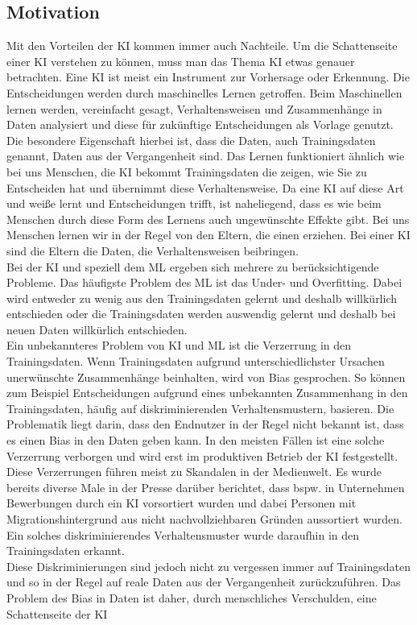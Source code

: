 \begin{onehalfspace}
        \newpage
        \section{Motivation}
        \label{subsec:motivation}
            Mit den Vorteilen der \ac*{KI} kommen immer auch Nachteile. Um die Schattenseite einer \ac*{KI} verstehen zu können, muss man das Thema \ac*{KI} etwas genauer betrachten. Eine \ac*{KI} ist meist ein Instrument zur Vorhersage oder Erkennung. Die Entscheidungen werden durch maschinelles Lernen getroffen. Beim Maschinellen lernen werden, vereinfacht gesagt, Verhaltensweisen und Zusammenhänge in Daten analysiert und diese für zukünftige Entscheidungen als Vorlage genutzt. Die besondere Eigenschaft hierbei ist, dass die Daten, auch Trainingsdaten genannt, Daten aus der Vergangenheit sind. Das Lernen funktioniert ähnlich wie bei uns Menschen, die \ac*{KI} bekommt Trainingsdaten die zeigen, wie Sie zu Entscheiden hat und übernimmt diese Verhaltensweise. Da eine \ac*{KI} auf diese Art und weiße lernt und Entscheidungen trifft, ist naheliegend, dass es wie beim Menschen durch diese Form des Lernens auch ungewünschte Effekte gibt. Bei uns Menschen lernen wir in der Regel von den Eltern, die einen erziehen. Bei einer \ac*{KI} sind die Eltern die Daten, die Verhaltensweisen beibringen. 
            \\
            Bei der \ac*{KI} und speziell dem \ac{ML} ergeben sich mehrere zu berücksichtigende Probleme. Das häufigste Problem des \ac*{ML} ist das Under- und Overfitting. Dabei wird entweder zu wenig aus den Trainingsdaten gelernt und deshalb willkürlich entschieden oder die Trainingsdaten werden \glqq{}auswendig\grqq{} gelernt und deshalb bei neuen Daten willkürlich entschieden. 
            \\
            Ein unbekannteres Problem von \ac*{KI} und \ac*{ML} ist die Verzerrung in den Trainingsdaten. Wenn Trainingsdaten aufgrund unterschiedlichster Ursachen unerwünschte Zusammenhänge beinhalten, wird von Bias gesprochen. So können zum Beispiel Entscheidungen aufgrund eines unbekannten Zusammenhang in den Trainingsdaten, häufig auf diskriminierenden Verhaltensmustern, basieren. Die Problematik liegt darin, dass den Endnutzer in der Regel nicht bekannt ist, dass es einen Bias in den Daten geben kann. In den meisten Fällen ist eine solche Verzerrung verborgen und wird erst im produktiven Betrieb der \ac*{KI} festgestellt.
            \\
            Diese Verzerrungen führen meist zu Skandalen in der Medienwelt. Es wurde bereits diverse Male in der Presse darüber berichtet, dass bspw. in Unternehmen Bewerbungen durch ein \ac*{KI} vorsortiert wurden und dabei Personen mit Migrationshintergrund aus nicht nachvollziehbaren Gründen aussortiert wurden. Ein solches diskriminierendes Verhaltensmuster wurde daraufhin in den Trainingsdaten erkannt.
            \\
            Diese Diskriminierungen sind jedoch nicht zu vergessen immer auf Trainingsdaten und so in der Regel auf reale Daten aus der Vergangenheit zurückzuführen. Das Problem des Bias in Daten ist daher, durch menschliches Verschulden, eine Schattenseite der \ac*{KI} 


\end{onehalfspace}
